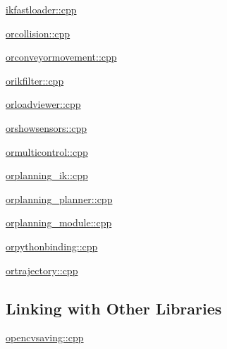 \begin{DoxyItemize}
\item \hyperlink{ikfastloader.cpp-example}{ikfastloader::cpp}
\item \hyperlink{orcollision.cpp-example}{orcollision::cpp}
\item \hyperlink{orconveyormovement.cpp-example}{orconveyormovement::cpp}
\item \hyperlink{orikfilter.cpp-example}{orikfilter::cpp}
\item \hyperlink{orloadviewer.cpp-example}{orloadviewer::cpp}
\item \hyperlink{orshowsensors.cpp-example}{orshowsensors::cpp}
\item \hyperlink{ormulticontrol.cpp-example}{ormulticontrol::cpp}
\item \hyperlink{orplanning__ik.cpp-example}{orplanning\_\-ik::cpp}
\item \hyperlink{orplanning__planner.cpp-example}{orplanning\_\-planner::cpp}
\item \hyperlink{orplanning__module.cpp-example}{orplanning\_\-module::cpp}
\item \hyperlink{orpythonbinding.cpp-example}{orpythonbinding::cpp}
\item \hyperlink{ortrajectory.cpp-example}{ortrajectory::cpp}
\end{DoxyItemize}\hypertarget{cpp__examples_cpp_examples_otherlib}{}\subsection{Linking with Other Libraries}\label{cpp__examples_cpp_examples_otherlib}

\begin{DoxyItemize}
\item \hyperlink{opencvsaving.cpp-example}{opencvsaving::cpp} 
\end{DoxyItemize}